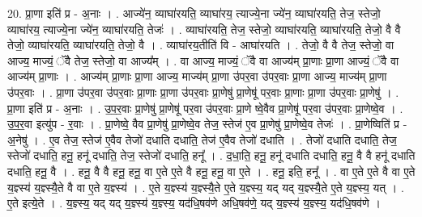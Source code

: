 \documentclass[17pt]{extarticle}
\begin{document}
20. प्रा॒णा इति॑ प्र - अ॒नाः । . आज्ये॑न॒ व्याघा॑रयति॒ व्याघा॑रय॒ त्याज्ये॒ना ज्ये॑न॒ व्याघा॑रयति॒ तेज॒ स्तेजो॒ व्याघा॑रय॒ त्याज्ये॒ना ज्ये॑न॒ व्याघा॑रयति॒ तेजः॑ । . व्याघा॑रयति॒ तेज॒ स्तेजो॒ व्याघा॑रयति॒ व्याघा॑रयति॒ तेजो॒ वै वै तेजो॒ व्याघा॑रयति॒ व्याघा॑रयति॒ तेजो॒ वै । . व्याघा॑रय॒तीति॑ वि - आघा॑रयति । . तेजो॒ वै वै तेज॒ स्तेजो॒ वा आज्य॒ माज्यं॒ ॅवै तेज॒ स्तेजो॒ वा आज्य᳚म् । . वा आज्य॒ माज्यं॒ ॅवै वा आज्य॑म् प्रा॒णाः प्रा॒णा आज्यं॒ ॅवै वा आज्य॑म् प्रा॒णाः । . आज्य॑म् प्रा॒णाः प्रा॒णा आज्य॒ माज्य॑म् प्रा॒णा उ॑पर॒वा उ॑पर॒वाः प्रा॒णा आज्य॒ माज्य॑म् प्रा॒णा उ॑पर॒वाः । . प्रा॒णा उ॑पर॒वा उ॑पर॒वाः प्रा॒णाः प्रा॒णा उ॑पर॒वाः प्रा॒णेषु॑ प्रा॒णेषू॑ पर॒वाः प्रा॒णाः प्रा॒णा उ॑पर॒वाः प्रा॒णेषु॑ । . प्रा॒णा इति॑ प्र - अ॒नाः । . उ॒प॒र॒वाः प्रा॒णेषु॑ प्रा॒णेषू॑ पर॒वा उ॑पर॒वाः प्रा॒णे ष्वे॒वैव प्रा॒णेषू॑ पर॒वा उ॑पर॒वाः प्रा॒णेष्वे॒व । . उ॒प॒र॒वा इत्यु॑प - र॒वाः । . प्रा॒णेष्वे॒ वैव प्रा॒णेषु॑ प्रा॒णेष्वे॒व तेज॒ स्तेज॑ ए॒व प्रा॒णेषु॑ प्रा॒णेष्वे॒व तेजः॑ । . प्रा॒णेष्विति॑ प्र - अ॒नेषु॑ । . ए॒व तेज॒ स्तेज॑ ए॒वैव तेजो॑ दधाति दधाति॒ तेज॑ ए॒वैव तेजो॑ दधाति । . तेजो॑ दधाति दधाति॒ तेज॒ स्तेजो॑ दधाति॒ हनू॒ हनू॑ दधाति॒ तेज॒ स्तेजो॑ दधाति॒ हनू᳚ । . द॒धा॒ति॒ हनू॒ हनू॑ दधाति दधाति॒ हनू॒ वै वै हनू॑ दधाति दधाति॒ हनू॒ वै । . हनू॒ वै वै हनू॒ हनू॒ वा ए॒ते ए॒ते वै हनू॒ हनू॒ वा ए॒ते । . हनू॒ इति॒ हनू᳚ । . वा ए॒ते ए॒ते वै वा ए॒ते य॒ज्ञ्स्य॑ य॒ज्ञ्स्यै॒ते वै वा ए॒ते य॒ज्ञ्स्य॑ । . ए॒ते य॒ज्ञ्स्य॑ य॒ज्ञ्स्यै॒ते ए॒ते य॒ज्ञ्स्य॒ यद् यद् य॒ज्ञ्स्यै॒ते ए॒ते य॒ज्ञ्स्य॒ यत् । . ए॒ते इत्ये॒ते । . य॒ज्ञ्स्य॒ यद् यद् य॒ज्ञ्स्य॑ य॒ज्ञ्स्य॒ यद॑धि॒षव॑णे अधि॒षव॑णे॒ यद् य॒ज्ञ्स्य॑ य॒ज्ञ्स्य॒ यद॑धि॒षव॑णे । \newline
\end{document}
